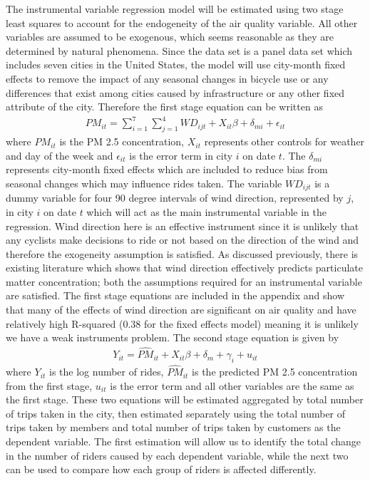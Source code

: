 \documentclass[12pt,letter paper]{article}
\begin{document}
The instrumental variable regression model will be estimated using two stage least squares to account for the endogeneity of the air quality variable.  All other variables are assumed to be exogenous, which seems reasonable as they are determined by natural phenomena.  Since the data set is a panel data set which includes seven cities in the United States, the model will use city-month fixed effects to remove the impact of any seasonal changes in bicycle use or any differences that exist among cities caused by infrastructure or any other fixed attribute of the city.  Therefore the first stage equation can be written as
\begin{gather*}
PM_{it} = \sum_{i = 1}^7 \sum_{j = 1}^4 WD_{ijt} + X_{it}\beta + \delta_{mi}  + \epsilon_{it}
\end{gather*}
where $PM_{it}$ is the PM 2.5 concentration, $X_{it}$ represents other controls for weather and day of the week and $\epsilon_{it}$ is the error term in city $i$ on date $t$.  The $\delta_{mi}$ represents city-month fixed effects which are included to reduce bias from seasonal changes which may influence rides taken.  The variable $WD_{ijt}$ is a dummy variable for four 90 degree intervals of wind direction, represented by $j$, in city $i$ on date $t$ which will act as the main instrumental variable in the regression.  Wind direction here is an effective instrument since it is unlikely that any cyclists make decisions to ride or not based on the direction of the wind and therefore the exogeneity assumption is satisfied.  As discussed previously, there is existing literature which shows that wind direction effectively predicts particulate matter concentration; both the assumptions required for an instrumental variable are satisfied.  The first stage equations are included in the appendix and show that many of the effects of wind direction are significant on air quality and have relatively high R-squared (0.38 for the fixed effects model) meaning it is unlikely we have a weak instruments problem.  The second stage equation is given by
\begin{gather*}
Y_{it} = \widehat{PM}_{it} + X_{it}\beta + \delta_m + \gamma_i + u_{it}
\end{gather*}
where $Y_{it}$ is the log number of rides, $\widehat{PM}_{it}$ is the predicted PM 2.5 concentration from the first stage, $u_{it}$ is the error term and all other variables are the same as the first stage.  These two equations will be estimated aggregated by total number of trips taken in the city, then estimated separately using the total number of trips taken by members and total number of trips taken by customers as the dependent variable.  The first estimation will allow us to identify the total change in the number of riders caused by each dependent variable, while the next two can be used to compare how each group of riders is affected differently.  
\end{document}
